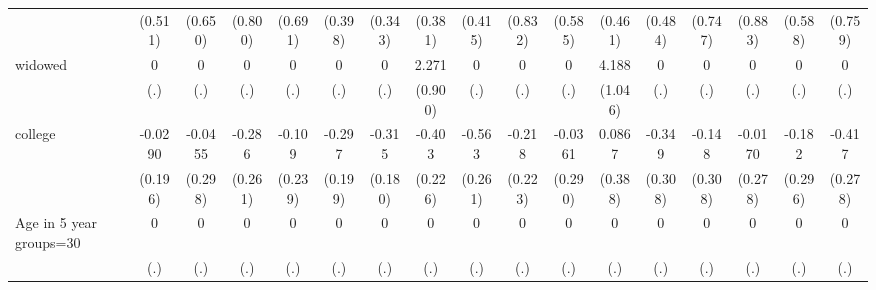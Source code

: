 {\begin{tabular}{l*{16}{c}}
                    &     (0.511)         &     (0.650)         &     (0.800)         &     (0.691)         &     (0.398)         &     (0.343)         &     (0.381)         &     (0.415)         &     (0.832)         &     (0.585)         &     (0.461)         &     (0.484)         &     (0.747)         &     (0.883)         &     (0.588)         &     (0.759)         \\
[1em]
widowed             &           0         &           0         &           0         &           0         &           0         &           0         &       2.271\sym{*}  &           0         &           0         &           0         &       4.188\sym{***}&           0         &           0         &           0         &           0         &           0         \\
                    &         (.)         &         (.)         &         (.)         &         (.)         &         (.)         &         (.)         &     (0.900)         &         (.)         &         (.)         &         (.)         &     (1.046)         &         (.)         &         (.)         &         (.)         &         (.)         &         (.)         \\
[1em]
college             &     -0.0290         &     -0.0455         &      -0.286         &      -0.109         &      -0.297         &      -0.315         &      -0.403         &      -0.563\sym{*}  &      -0.218         &     -0.0361         &      0.0867         &      -0.349         &      -0.148         &     -0.0170         &      -0.182         &      -0.417         \\
                    &     (0.196)         &     (0.298)         &     (0.261)         &     (0.239)         &     (0.199)         &     (0.180)         &     (0.226)         &     (0.261)         &     (0.223)         &     (0.290)         &     (0.388)         &     (0.308)         &     (0.308)         &     (0.278)         &     (0.296)         &     (0.278)         \\
[1em]
Age in 5 year groups=30&           0         &           0         &           0         &           0         &           0         &           0         &           0         &           0         &           0         &           0         &           0         &           0         &           0         &           0         &           0         &           0         \\
                    &         (.)         &         (.)         &         (.)         &         (.)         &         (.)         &         (.)         &         (.)         &         (.)         &         (.)         &         (.)         &         (.)         &         (.)         &         (.)         &         (.)         &         (.)         &         (.)         \\

\end{tabular}}
